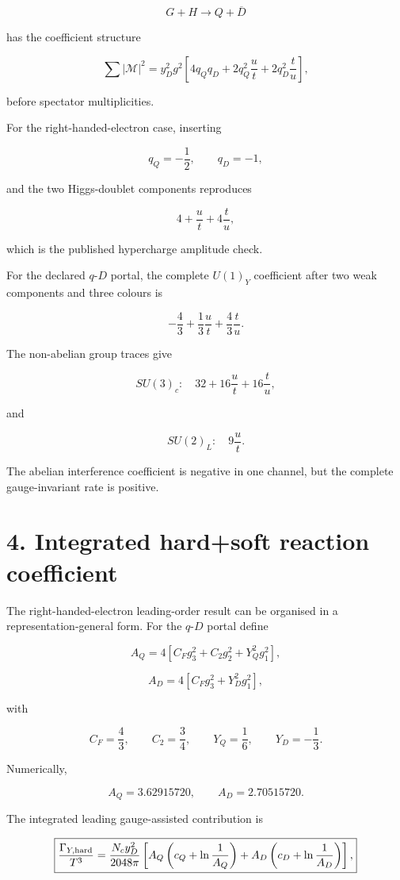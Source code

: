 \documentclass[
  10pt,
]{article}
\begin{document}
\[
G+H\rightarrow Q+\overline D
\]

has the coefficient structure

\[
\sum|\mathcal M|^2
=
y_D^2g^2
\left[
4q_Qq_D
+2q_Q^2\frac{u}{t}
+2q_D^2\frac{t}{u}
\right],
\]

before spectator multiplicities.

For the right-handed-electron case, inserting

\[
q_Q=-\frac12,
\qquad
q_D=-1,
\]

and the two Higgs-doublet components reproduces

\[
4+\frac{u}{t}+4\frac{t}{u},
\]

which is the published hypercharge amplitude check.

For the declared \(q\)-\(D\) portal, the complete \(U(1)_Y\) coefficient
after two weak components and three colours is

\[
\boxed{
-\frac43
+\frac13\frac{u}{t}
+\frac43\frac{t}{u}.
}
\]

The non-abelian group traces give

\[
\boxed{
SU(3)_c:
\quad
32+16\frac{u}{t}+16\frac{t}{u},
}
\]

and

\[
\boxed{
SU(2)_L:
\quad
9\frac{u}{t}.
}
\]

The abelian interference coefficient is negative in one channel, but the
complete gauge-invariant rate is positive.

\section{4. Integrated hard+soft reaction
coefficient}\label{integrated-hardsoft-reaction-coefficient}

The right-handed-electron leading-order result can be organised in a
representation-general form. For the \(q\)-\(D\) portal define

\[
A_Q
=
4\left[
C_Fg_3^2+C_2g_2^2+Y_Q^2g_1^2
\right],
\]

\[
A_D
=
4\left[
C_Fg_3^2+Y_D^2g_1^2
\right],
\]

with

\[
C_F=\frac43,
\qquad
C_2=\frac34,
\qquad
Y_Q=\frac16,
\qquad
Y_D=-\frac13.
\]

Numerically,

\[
A_Q=3.62915720,
\qquad
A_D=2.70515720.
\]

The integrated leading gauge-assisted contribution is

\[
\boxed{
\frac{\Gamma_{Y,\rm hard}}{T^3}
=
\frac{N_cy_D^2}{2048\pi}
\left[
A_Q\left(c_Q+\ln\frac1{A_Q}\right)
+
A_D\left(c_D+\ln\frac1{A_D}\right)
\right],
}
\]
\end{document}
